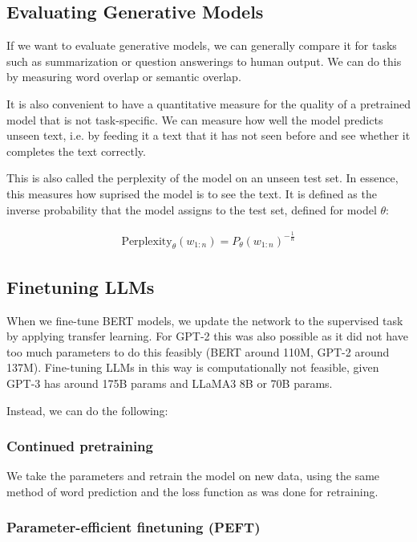 \subsection{Evaluating Generative Models}

If we want to evaluate generative models, we can generally compare it for
tasks such as summarization or question answerings to human output.
We can do this
by measuring word overlap or semantic overlap.

It is also convenient to have a quantitative measure for the quality of
a pretrained model that is not task-specific. We can measure how well the
model predicts unseen text, i.e. by feeding it a text that it has not seen
before and see whether it completes the text correctly.

This is also called the perplexity of the model on an unseen test
set. In essence, this measures how suprised the model is to see the text.
It is defined as the inverse probability that the model assigns to the test set,
defined for model $\theta$:

\begin{definition}[Perplexity]
  \begin{align*}
    \text{Perplexity}_\theta(w_{1:n}) = P_\theta(w_{1:n})^{-\frac{1}{n}}
  \end{align*}
\end{definition}

\subsection{Finetuning LLMs}

When we fine-tune BERT models, we update the network to the supervised
task by applying transfer learning. For GPT-2 this was also possible as
it did not have too much parameters to do this feasibly (BERT around
110M, GPT-2 around 137M).
Fine-tuning LLMs in this way is computationally not feasible, given
GPT-3 has around 175B params
and LLaMA3 8B or 70B params.

Instead, we can do the following:

\subsubsection{Continued pretraining}

We take the parameters and retrain the model on new data, using the same
method of word prediction and the loss function as was done for retraining.

\subsubsection{Parameter-efficient finetuning (PEFT)}

